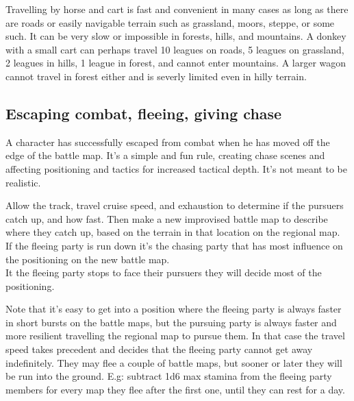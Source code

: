 Travelling by horse and cart is fast and convenient in many cases as long as there are roads or easily navigable terrain such as grassland, moors, steppe, or some such. It can be very slow or impossible in forests, hills, and mountains. A donkey with a small cart can perhaps travel 10 leagues on roads, 5 leagues on grassland, 2 leagues in hills, 1 league in forest, and cannot enter mountains. A larger wagon cannot travel in forest either and is severly limited even in hilly terrain.


%



\subsection*{Escaping combat, fleeing, giving chase}
A character has successfully escaped from combat when he has moved off the edge of the battle map. It's a simple and fun rule, creating chase scenes and affecting positioning and tactics for increased tactical depth. It's not meant to be realistic.

Allow the track, travel cruise speed, and exhaustion to determine if the pursuers catch up, and how fast. Then make a new improvised battle map to describe where they catch up, based on the terrain in that location on the regional map.\\
If the fleeing party is run down it's the chasing party that has most influence on the positioning on the new battle map.\\
It the fleeing party stops to face their pursuers they will decide most of the positioning.

Note that it's easy to get into a position where the fleeing party is always faster in short bursts on the battle maps, but the pursuing party is always faster and more resilient travelling the regional map to pursue them. In that case the travel speed takes precedent and decides that the fleeing party cannot get away indefinitely. They may flee a couple of battle maps, but sooner or later they will be run into the ground. E.g: subtract 1d6 max stamina from the fleeing party members for every map they flee after the first one, until they can rest for a day.

